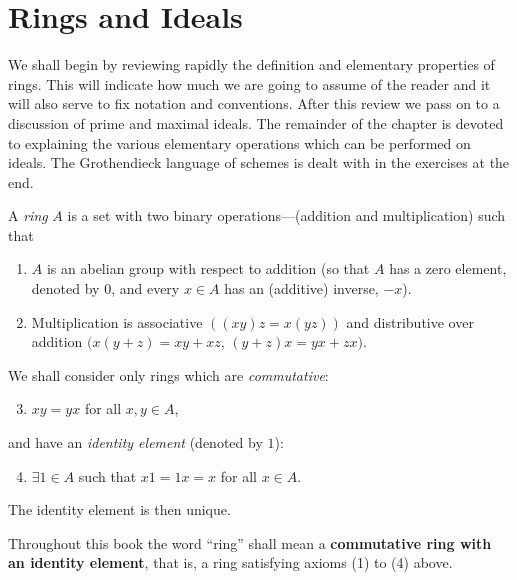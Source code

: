 \chapter{Rings and Ideals}\label{chapter1}

We shall begin by reviewing rapidly the definition and elementary properties of rings. This will indicate how much we are going to assume of the reader and it will also serve to fix notation and conventions. After this review we pass on to a discussion of prime and maximal ideals. The remainder of the chapter is devoted to explaining the various elementary operations which can be performed on ideals. The Grothendieck language of schemes is dealt with in the exercises at the end.



A \emph{ring} $A$ is a set with two binary operations---(addition and multiplication) such that
\begin{enumerate}
    \item $A$ is an abelian group with respect to addition (so that $A$ has a zero element, denoted by $0$, and every $x \in A$ has an (additive) inverse, $-x$).
    \item Multiplication is associative $((xy)z = x(yz))$ and distributive over addition $(x(y + z) = xy + xz$, $(y + z)x = yx + zx)$.
\end{enumerate}

We shall consider only rings which are \emph{commutative}:
\begin{enumerate}
    \setcounter{enumi}{2}
    \item $xy = yx$ for all $x, y \in A$,
\end{enumerate}
and have an \emph{identity element} (denoted by $1$):
\begin{enumerate}
    \setcounter{enumi}{3}
    \item $\exists 1 \in A$ such that $x1 = 1x = x$ for all $x \in A$.
\end{enumerate}

The identity element is then unique.

Throughout this book the word ``ring'' shall mean a \textbf{commutative ring with an identity element}, that is, a ring satisfying axioms (1) to (4) above.

